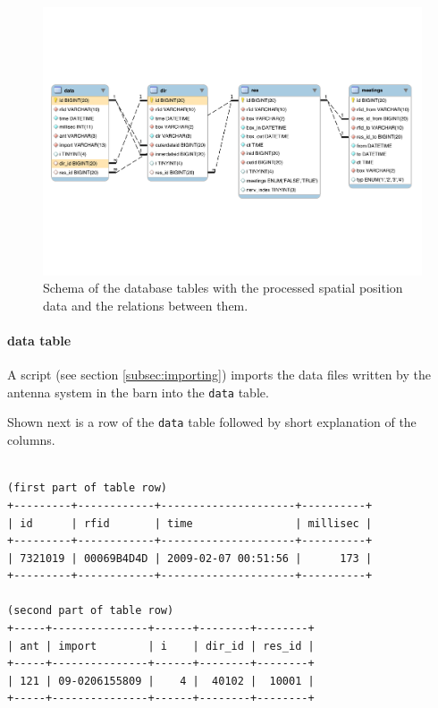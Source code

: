 \begin{figure}[htpb]
\begin{center}
  \includegraphics[width=\textwidth]{assets/pdf/processed_data_schema.pdf}
  \caption[Schema of database tables with processed data]{Schema of the database tables with the processed spatial position data and the relations between them.}
  \label{fig:processed_data_schema}
\end{center}
\end{figure} 

\paragraph{data table}
\label{para:data_table}

A script (see section \ref{subsec:importing}) imports the data files written by the antenna system in the barn into the \lstinline|data| table.

Shown next is a row of the \lstinline|data| table followed by short explanation of the columns.

\codescript
\begin{lstlisting}[frame=none]

(first part of table row)
+---------+------------+---------------------+----------+
| id      | rfid       | time                | millisec |
+---------+------------+---------------------+----------+
| 7321019 | 00069B4D4D | 2009-02-07 00:51:56 |      173 |
+---------+------------+---------------------+----------+

(second part of table row)
+-----+---------------+------+--------+--------+
| ant | import        | i    | dir_id | res_id |
+-----+---------------+------+--------+--------+
| 121 | 09-0206155809 |    4 |  40102 |  10001 |
+-----+---------------+------+--------+--------+

\end{lstlisting}

